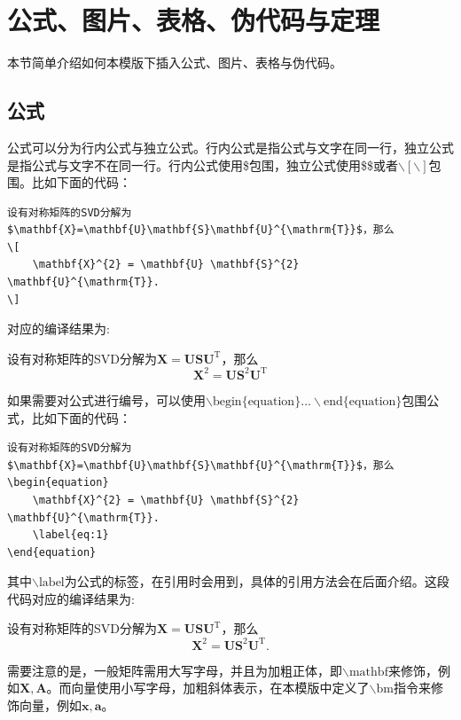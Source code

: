 \section{公式、图片、表格、伪代码与定理}
本节简单介绍如何本模版下插入公式、图片、表格与伪代码。
\subsection{公式}

公式可以分为行内公式与独立公式。行内公式是指公式与文字在同一行，独立公式是指公式与文字不在同一行。行内公式使用\$包围，独立公式使用\$\$或者$\backslash [ \backslash]$包围。比如下面的代码：

\begin{lstlisting}
设有对称矩阵的SVD分解为$\mathbf{X}=\mathbf{U}\mathbf{S}\mathbf{U}^{\mathrm{T}}$，那么
\[
    \mathbf{X}^{2} = \mathbf{U} \mathbf{S}^{2} \mathbf{U}^{\mathrm{T}}.
\]
\end{lstlisting}
对应的编译结果为:
\begin{shaded}
设有对称矩阵的SVD分解为$\mathbf{X}=\mathbf{U}\mathbf{S}\mathbf{U}^{\mathrm{T}}$，那么
\[
    \mathbf{X}^{2} = \mathbf{U} \mathbf{S}^{2} \mathbf{U}^{\mathrm{T}}
\]
\end{shaded}
如果需要对公式进行编号，可以使用$\backslash \text{begin\{equation\}} \dots \backslash \text{end\{equation\}}$包围公式，比如下面的代码：
\begin{lstlisting}
设有对称矩阵的SVD分解为$\mathbf{X}=\mathbf{U}\mathbf{S}\mathbf{U}^{\mathrm{T}}$，那么
\begin{equation}
    \mathbf{X}^{2} = \mathbf{U} \mathbf{S}^{2} \mathbf{U}^{\mathrm{T}}.
    \label{eq:1}
\end{equation}
\end{lstlisting}
其中$\backslash \text{label}$为公式的标签，在引用时会用到，具体的引用方法会在后面介绍。这段代码对应的编译结果为:
\begin{shaded}
设有对称矩阵的SVD分解为$\mathbf{X}=\mathbf{U}\mathbf{S}\mathbf{U}^{\mathrm{T}}$，那么
\begin{equation}
    \mathbf{X}^{2} = \mathbf{U} \mathbf{S}^{2} \mathbf{U}^{\mathrm{T}}.
    \label{eq:1}
\end{equation}
\end{shaded}


需要注意的是，一般矩阵需用大写字母，并且为加粗正体，即$\backslash \text{mathbf}$来修饰，例如$\mathbf{X},\mathbf{A}$。而向量使用小写字母，加粗斜体表示，在本模版中定义了$\backslash \text{bm}$指令来修饰向量，例如$\bm{x},\bm{a}$。

